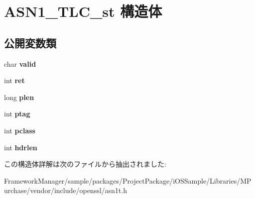 \hypertarget{struct_a_s_n1___t_l_c__st}{}\section{A\+S\+N1\+\_\+\+T\+L\+C\+\_\+st 構造体}
\label{struct_a_s_n1___t_l_c__st}
\subsection*{公開変数類}
\begin{DoxyCompactItemize}
\item 
\hypertarget{struct_a_s_n1___t_l_c__st_aae7c516be44ce4351b1d5666ac71ab32}{}char {\bfseries valid}\label{struct_a_s_n1___t_l_c__st_aae7c516be44ce4351b1d5666ac71ab32}

\item 
\hypertarget{struct_a_s_n1___t_l_c__st_afea043db523f6ea0ca08eb16668f4992}{}int {\bfseries ret}\label{struct_a_s_n1___t_l_c__st_afea043db523f6ea0ca08eb16668f4992}

\item 
\hypertarget{struct_a_s_n1___t_l_c__st_af587b734c7de4809c665bce45fc2b66a}{}long {\bfseries plen}\label{struct_a_s_n1___t_l_c__st_af587b734c7de4809c665bce45fc2b66a}

\item 
\hypertarget{struct_a_s_n1___t_l_c__st_a58cd31917a573675361476d87346549a}{}int {\bfseries ptag}\label{struct_a_s_n1___t_l_c__st_a58cd31917a573675361476d87346549a}

\item 
\hypertarget{struct_a_s_n1___t_l_c__st_a33e7ac01afc4ecad3cf6d6d6d8f929f5}{}int {\bfseries pclass}\label{struct_a_s_n1___t_l_c__st_a33e7ac01afc4ecad3cf6d6d6d8f929f5}

\item 
\hypertarget{struct_a_s_n1___t_l_c__st_aea820e4a42d10f37f8e095af41e0067a}{}int {\bfseries hdrlen}\label{struct_a_s_n1___t_l_c__st_aea820e4a42d10f37f8e095af41e0067a}

\end{DoxyCompactItemize}


この構造体詳解は次のファイルから抽出されました\+:\begin{DoxyCompactItemize}
\item 
Framework\+Manager/sample/packages/\+Project\+Package/i\+O\+S\+Sample/\+Libraries/\+M\+Purchase/vendor/include/openssl/asn1t.\+h\end{DoxyCompactItemize}
